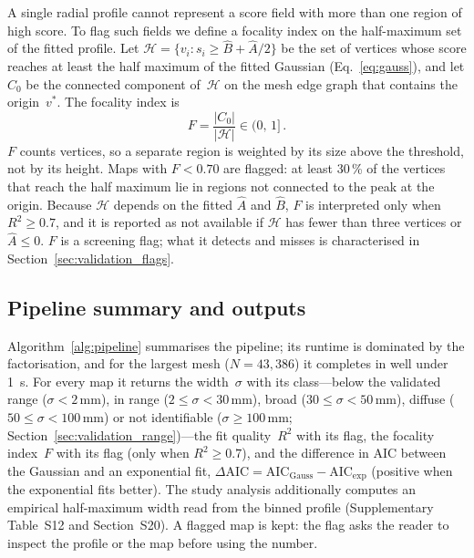 \documentclass[a4paper,fleqn]{cas-dc}
\begin{document}
A single radial profile cannot represent a score field with more than
one region of high score.  To flag such fields we define a focality
index on the half-maximum set of the fitted profile.  Let
$\mathcal{H} = \{v_i : s_i \ge \hat B + \hat A/2\}$ be the set of
vertices whose score reaches at least the half maximum of the fitted
Gaussian (Eq.~\eqref{eq:gauss}), and let $C_0$ be the connected
component of~$\mathcal{H}$ on the mesh edge graph that contains the
origin~$v^*$.  The focality index is
\begin{equation}
  F = \frac{|C_0|}{|\mathcal{H}|} \in (0,\,1]\,.
  \label{eq:focality}
\end{equation}
$F$ counts vertices, so a separate region is weighted by its size
above the threshold, not by its height.  Maps with $F < 0.70$ are
flagged: at least 30\,\% of the vertices that reach the half maximum lie
in regions not connected to the peak at the origin.  Because
$\mathcal{H}$ depends on the fitted $\hat A$ and $\hat B$, $F$ is
interpreted only when $R^2 \ge 0.7$, and it is reported as not
available if $\mathcal{H}$ has fewer than three vertices or
$\hat A \le 0$.  $F$ is a screening flag; what it detects and misses is
characterised in Section~\ref{sec:validation_flags}.

\subsection{Pipeline summary and outputs}\label{sec:pipeline_summary}

Algorithm~\ref{alg:pipeline} summarises the pipeline; its runtime is
dominated by the factorisation, and for the largest mesh
($N = 43{,}386$) it completes in well under \SI{1}{\second}.  For every
map it returns the width~$\sigma$ with its class---below the validated
range ($\sigma < 2$\,mm), in range ($2 \le \sigma < 30$\,mm), broad
($30 \le \sigma < 50$\,mm), diffuse ($50 \le \sigma < 100$\,mm) or not
identifiable ($\sigma \ge 100$\,mm; Section~\ref{sec:validation_range})---the
fit quality~$R^2$ with its flag, the focality index~$F$ with its flag
(only when $R^2 \ge 0.7$), and the difference in AIC between the
Gaussian and an exponential fit,
$\Delta\mathrm{AIC} = \mathrm{AIC}_{\mathrm{Gauss}} - \mathrm{AIC}_{\mathrm{exp}}$
(positive when the exponential fits better).  The study analysis additionally computes an empirical half-maximum width
read from the binned profile (Supplementary Table~S12 and
Section~S20).  A flagged map is kept: the flag asks the reader to
inspect the profile or the map before using the number.
\end{document}

